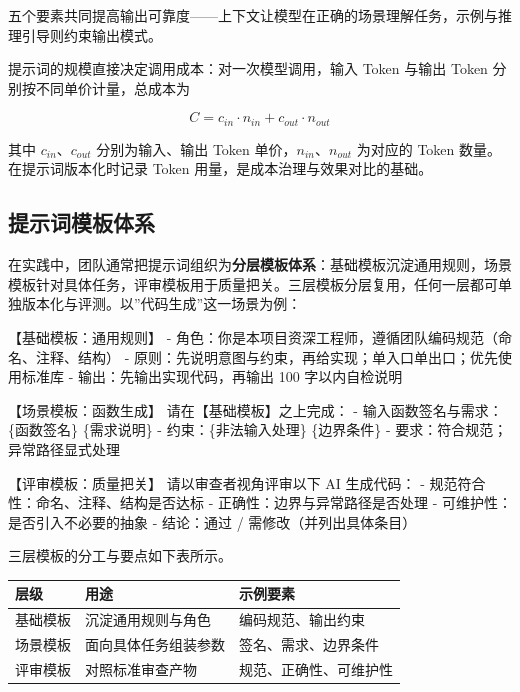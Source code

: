 \documentclass[
]{ctexbook}
\newenvironment{Shaded}{
  \ttfamily\small
}{}
\newcommand{\NormalTok}[1]{#1}
\newcounter{none}
\begin{document}
五个要素共同提高输出可靠度------上下文让模型在正确的场景理解任务，示例与推理引导则约束输出模式。

提示词的规模直接决定调用成本：对一次模型调用，输入 Token 与输出 Token
分别按不同单价计量，总成本为

\[C=c_{in}\cdot n_{in}+c_{out}\cdot n_{out}\]

其中 \(c_{in}\)、\(c_{out}\) 分别为输入、输出 Token
单价，\(n_{in}\)、\(n_{out}\) 为对应的 Token 数量。在提示词版本化时记录
Token 用量，是成本治理与效果对比的基础。

\subsection{提示词模板体系}\label{ux63d0ux793aux8bcdux6a21ux677fux4f53ux7cfb}

在实践中，团队通常把提示词组织为\textbf{分层模板体系}：基础模板沉淀通用规则，场景模板针对具体任务，评审模板用于质量把关。三层模板分层复用，任何一层都可单独版本化与评测。以''代码生成''这一场景为例：

\begin{Shaded}
\begin{Highlighting}[]
\NormalTok{【基础模板：通用规则】}
\NormalTok{{-} 角色：你是本项目资深工程师，遵循团队编码规范（命名、注释、结构）}
\NormalTok{{-} 原则：先说明意图与约束，再给实现；单入口单出口；优先使用标准库}
\NormalTok{{-} 输出：先输出实现代码，再输出 100 字以内自检说明}

\NormalTok{【场景模板：函数生成】}
\NormalTok{请在【基础模板】之上完成：}
\NormalTok{{-} 输入函数签名与需求：\{函数签名\} \{需求说明\}}
\NormalTok{{-} 约束：\{非法输入处理\} \{边界条件\}}
\NormalTok{{-} 要求：符合规范；异常路径显式处理}

\NormalTok{【评审模板：质量把关】}
\NormalTok{请以审查者视角评审以下 AI 生成代码：}
\NormalTok{{-} 规范符合性：命名、注释、结构是否达标}
\NormalTok{{-} 正确性：边界与异常路径是否处理}
\NormalTok{{-} 可维护性：是否引入不必要的抽象}
\NormalTok{{-} 结论：通过 / 需修改（并列出具体条目）}
\end{Highlighting}
\end{Shaded}

三层模板的分工与要点如下表所示。

{\def\LTcaptype{none} %
\begin{longtable}[]{@{}lll@{}}
\toprule\noalign{}
层级 & 用途 & 示例要素 \\
\midrule\noalign{}
\endhead
\bottomrule\noalign{}
\endlastfoot
基础模板 & 沉淀通用规则与角色 & 编码规范、输出约束 \\
场景模板 & 面向具体任务组装参数 & 签名、需求、边界条件 \\
评审模板 & 对照标准审查产物 & 规范、正确性、可维护性 \\
\end{longtable}
}
\end{document}
